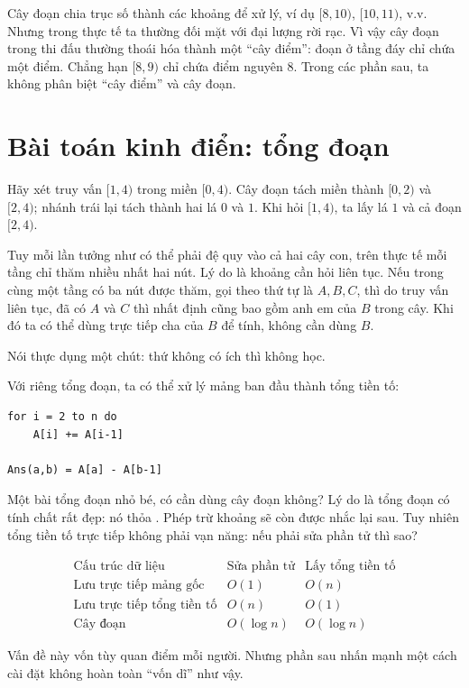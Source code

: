 \documentclass[11pt]{article}
\begin{document}
Cây đoạn chia trục số thành các khoảng để xử lý, ví dụ $[8,10)$,
$[10,11)$, v.v.  Nhưng trong thực tế ta thường đối mặt với đại lượng rời rạc.
Vì vậy cây đoạn trong thi đấu thường thoái hóa thành một ``cây điểm'': đoạn ở
tầng đáy chỉ chứa một điểm.  Chẳng hạn $[8,9)$ chỉ chứa điểm nguyên $8$.  Trong
các phần sau, ta không phân biệt ``cây điểm'' và cây đoạn.

\section{Bài toán kinh điển: tổng đoạn}

Hãy xét truy vấn $[1,4)$ trong miền $[0,4)$.  Cây đoạn tách miền thành
$[0,2)$ và $[2,4)$; nhánh trái lại tách thành hai lá $0$ và $1$.  Khi hỏi
$[1,4)$, ta lấy lá $1$ và cả đoạn $[2,4)$.

Tuy mỗi lần tưởng như có thể phải đệ quy vào cả hai cây con, trên thực tế mỗi
tầng chỉ thăm nhiều nhất hai nút.  Lý do là khoảng cần hỏi liên tục.  Nếu trong
cùng một tầng có ba nút được thăm, gọi theo thứ tự là $A,B,C$, thì do truy vấn
liên tục, đã có $A$ và $C$ thì nhất định cũng bao gồm anh em của $B$ trong cây.
Khi đó ta có thể dùng trực tiếp cha của $B$ để tính, không cần dùng $B$.

Nói thực dụng một chút: thứ không có ích thì không học.

Với riêng tổng đoạn, ta có thể xử lý mảng ban đầu thành tổng tiền tố:
\begin{verbatim}
for i = 2 to n do
    A[i] += A[i-1]

Ans(a,b) = A[a] - A[b-1]
\end{verbatim}
Một bài tổng đoạn nhỏ bé, có cần dùng cây đoạn không?  Lý do là tổng đoạn có
tính chất rất đẹp: nó thỏa .  Phép trừ khoảng sẽ còn được
nhắc lại sau.  Tuy nhiên tổng tiền tố trực tiếp không phải vạn năng: nếu phải
sửa phần tử thì sao?

\[
\begin{array}{lcc}
\text{Cấu trúc dữ liệu} & \text{Sửa phần tử} & \text{Lấy tổng tiền tố}\\
\hline
\text{Lưu trực tiếp mảng gốc} & O(1) & O(n)\\
\text{Lưu trực tiếp tổng tiền tố} & O(n) & O(1)\\
\text{Cây đoạn} & O(\log n) & O(\log n)
\end{array}
\]

Vấn đề này vốn tùy quan điểm mỗi người.  Nhưng phần sau nhấn mạnh một cách cài
đặt không hoàn toàn ``vốn dĩ'' như vậy.
\end{document}
